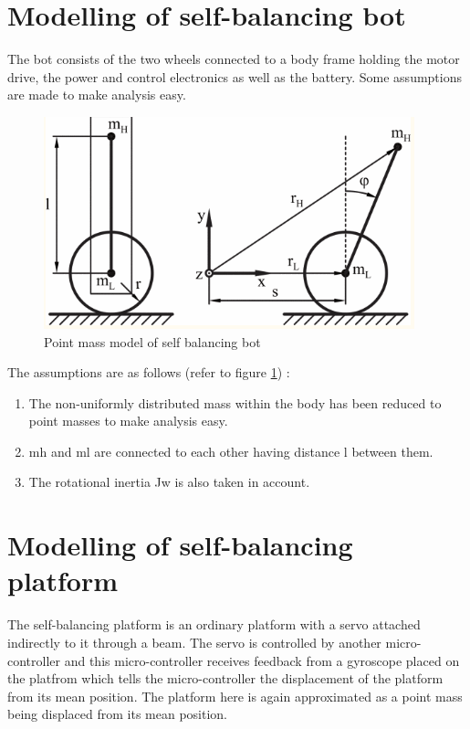 \section{Modelling of self-balancing bot}

The bot consists of the two wheels connected to a body frame holding the motor drive, the power and control electronics as well as the battery. Some assumptions are made to make analysis easy.\newline

\begin{figure}[H]
\centering
\includegraphics{images/dynamics}
\caption{Point mass model of self balancing bot}
\label{fig:dynamics}
\end{figure}

\clearpage

The assumptions are as follows (refer to figure \ref{fig:dynamics}) :
\begin{enumerate}
  \item The non-uniformly distributed mass within the body has been reduced to point masses to make analysis easy.
  \item mh and ml are connected to each other having distance l between them.
  \item The rotational inertia Jw is also taken in account.
\end{enumerate}

\section{Modelling of self-balancing platform}

The self-balancing platform is an ordinary platform with a servo attached indirectly to it through a beam. The servo is controlled by another micro-controller and this micro-controller receives feedback from a gyroscope placed on the platfrom which tells the micro-controller the displacement of the platform from its mean position. The platform here is again approximated as a point mass being displaced from its mean position.


